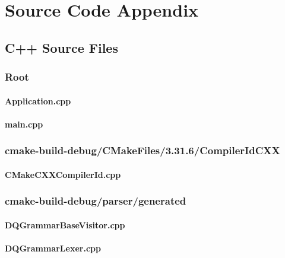 
\chapter{Source Code Appendix}

\section{C++ Source Files}

\subsection*{Root}

\subsubsection*{Application.cpp}


\subsubsection*{main.cpp}


\subsection*{cmake-build-debug/CMakeFiles/3.31.6/CompilerIdCXX}

\subsubsection*{CMakeCXXCompilerId.cpp}


\subsection*{cmake-build-debug/parser/generated}

\subsubsection*{DQGrammarBaseVisitor.cpp}


\subsubsection*{DQGrammarLexer.cpp}


